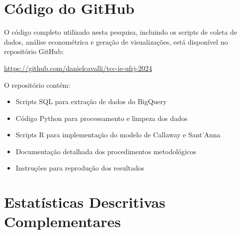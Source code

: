 \documentclass[
	12pt,				%
	oneside,			%
	a4paper,			%
	english,			%
	french,				%
	spanish,			%
	brazil				%
	]{abntex2}
\begin{document}


%
%


\begin{apendicesenv}

\partapendices

\chapter{Código do GitHub}

O código completo utilizado nesta pesquisa, incluindo os scripts de coleta de dados, análise econométrica e geração de visualizações, está disponível no repositório GitHub:

\url{https://github.com/danielcavalli/tcc-ie-ufrj-2024}

O repositório contém:
\begin{itemize}
\item Scripts SQL para extração de dados do BigQuery
\item Código Python para processamento e limpeza dos dados
\item Scripts R para implementação do modelo de Callaway e Sant'Anna
\item Documentação detalhada dos procedimentos metodológicos
\item Instruções para reprodução dos resultados
\end{itemize}

\chapter{Estatísticas Descritivas Complementares}


\end{apendicesenv}
\end{document}
